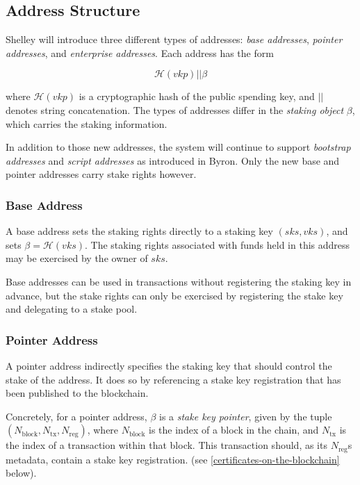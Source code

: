 \documentclass[11pt,a4paper]{article}
\begin{document}
\subsection{Address Structure}\label{address-structure}

Shelley will introduce three different types of addresses: \emph{base
addresses}, \emph{pointer addresses}, and \emph{enterprise addresses}.
Each address has the form

\[
\mathcal{H}({vkp}) || \beta
\]

where \(\mathcal{H}({vkp})\) is a cryptographic hash of the public
spending key, and \(||\) denotes string concatenation. The types of
addresses differ in the \emph{staking object} \(\beta\), which carries
the staking information.

In addition to those new addresses, the system will continue to support
\emph{bootstrap addresses} and \emph{script addresses} as introduced in
Byron. Only the new base and pointer addresses carry stake rights
however.

\subsubsection{Base Address}\label{base-address}

A base address sets the staking rights directly to a staking key
\((sks, vks)\), and sets \(\beta = \mathcal{H}(vks)\). The staking
rights associated with funds held in this address may be exercised by
the owner of \(sks\).

Base addresses can be used in transactions without registering the
staking key in advance, but the stake rights can only be exercised by
registering the stake key and delegating to a stake pool.

\subsubsection{Pointer Address}\label{pointer-address}

A pointer address indirectly specifies the staking key that should
control the stake of the address. It does so by referencing a stake key
registration that has been published to the blockchain.

Concretely, for a pointer address, \(\beta\) is a \emph{stake key
pointer}, given by the tuple
\((N_\text{block}, N_\text{tx}, N_\text{reg})\), where
\(N_\text{block}\) is the index of a block in the chain, and
\(N_\text{tx}\) is the index of a transaction within that block. This
transaction should, as its \(N_\text{reg}\)s metadata, contain a stake
key registration. (see \ref{certificates-on-the-blockchain} below).
\end{document}
